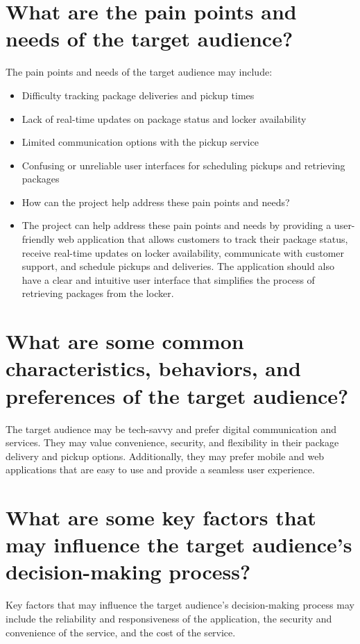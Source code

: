 \documentclass{article}
\begin{document}
\section{What are the pain points and needs of the target audience?}
The pain points and needs of the target audience may include:
\begin{itemize}
    \item Difficulty tracking package deliveries and pickup times
    \item Lack of real-time updates on package status and locker availability
    \item Limited communication options with the pickup service
    \item Confusing or unreliable user interfaces for scheduling pickups and retrieving packages
    \item How can the project help address these pain points and needs?
    \item The project can help address these pain points and needs by providing a user-friendly web application that allows customers to track their package status, receive real-time updates on locker availability, communicate with customer support, and schedule pickups and deliveries. The application should also have a clear and intuitive user interface that simplifies the process of retrieving packages from the locker.
\end{itemize}

\section{What are some common characteristics, behaviors, and preferences of the target audience?}
The target audience may be tech-savvy and prefer digital communication and services. They may value convenience, security, and flexibility in their package delivery and pickup options. Additionally, they may prefer mobile and web applications that are easy to use and provide a seamless user experience.

\section{What are some key factors that may influence the target audience's decision-making process?}
Key factors that may influence the target audience's decision-making process may include the reliability and responsiveness of the application, the security and convenience of the service, and the cost of the service.
\end{document}

